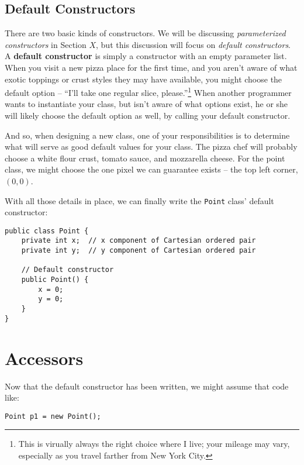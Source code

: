 \subsection{Default Constructors}

There are two basic kinds of constructors.  We will be discussing \textit{parameterized constructors} in Section $X$, but this discussion will focus on \textit{default constructors}.  A \textbf{default constructor} is simply a constructor with an empty parameter list.  When you visit a new pizza place for the first time, and you aren't aware of what exotic toppings or crust styles they may have available, you might choose the default option -- ``I'll take one regular slice, please.''\footnote{This is virually always the right choice where I live; your mileage may vary, especially as you travel farther from New York City.}  When another programmer wants to instantiate your class, but isn't aware of what options exist, he or she will likely choose the default option as well, by calling your default constructor.

And so, when designing a new class, one of your responsibilities is to determine what will serve as good default values for your class.  The pizza chef will probably choose a white flour crust, tomato sauce, and mozzarella cheese.  For the point class, we might choose the one pixel we can guarantee exists -- the top left corner, $(0,0)$.

With all those details in place, we can finally write the \texttt{Point} class' default constructor:

\begin{verbatim}
public class Point {
    private int x;  // x component of Cartesian ordered pair
    private int y;  // y component of Cartesian ordered pair

    // Default constructor
    public Point() {
        x = 0;
        y = 0;
    }
}
\end{verbatim}

\section{Accessors}

Now that the default constructor has been written, we might assume that code like:

\begin{verbatim}
Point p1 = new Point();
\end{verbatim}

